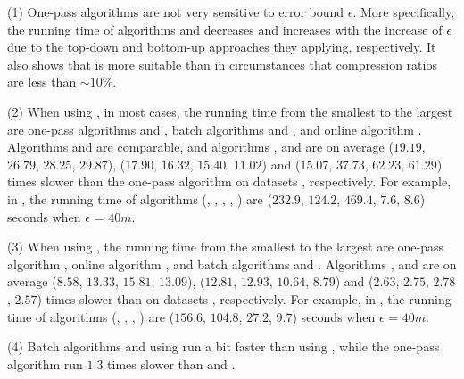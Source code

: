 \sstab (1) One-pass algorithms are not very sensitive to error bound $\epsilon$. 
More specifically, the running time of algorithms \dpa and \tpa decreases and increases with the increase of $\epsilon$ due to the top-down and bottom-up approaches they applying, respectively. It also shows that \dpa is more suitable than \tpa in circumstances that compression ratios are less than $\sim 10\%$.

\sstab (2) When using \ped, in most cases, the running time from the smallest to the largest are one-pass algorithms \siped and \operb, batch algorithms \tpa and \dpa, and online algorithm \bqsa. 
Algorithms \siped and \operb are comparable, and algorithms \tpa, \dpa and \bqsa are on average
($19.19$, $26.79$, $28.25$, $29.87$), ($17.90$, $16.32$, $15.40$, $11.02$) and ($15.07$, $37.73$, $62.23$, $61.29$)
times slower than the one-pass algorithm \siped on datasets \dSets, respectively.
% 
For example, in \mopsi, the running time of algorithms
(\tpa, \dpa, \bqsa, \siped, \operb ) are ($232.9$, $124.2$, $469.4$, $7.6$, $8.6$) seconds when $\epsilon$ = $40m$.

\sstab (3) When using \sed, the running time from the smallest to the largest are one-pass algorithm \cised, online algorithm \squishe, and batch algorithms \tpa and \dpa. 
Algorithms \tpa, \dpa and \squishe are on average
($8.58$, $13.33$, $15.81$, $13.09$), ($12.81$, $12.93$, $10.64$, $8.79$) and
($2.63$, $2.75$, $2.78$, $2.57$) times slower than \cised on datasets \dSets, respectively.
%
For example, in \mopsi, the running time of algorithms
(\tpa, \dpa, \squishe, \cised) are  ($156.6$, $104.8$, $27.2$, $9.7$) seconds when $\epsilon$ = $40m$.

\sstab (4) Batch algorithms \dpa and \tpa using \sed run a bit faster than using
\ped, while the one-pass algorithm \cised run $1.3$ times slower than \siped and \operb.



